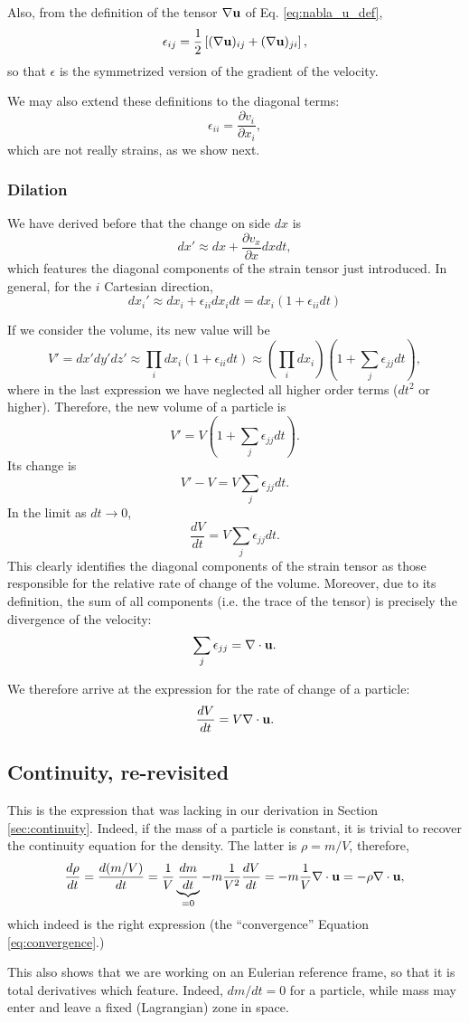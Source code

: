 Also, from the definition of the tensor $\nabla \mathbf{u}$ of
Eq. \ref{eq:nabla_u_def},
\begin{equation}
  \label{eq:epsilon_as_grad_u}
  \epsilon_{ij} = \frac12
  \left[
    (\nabla \mathbf{u})_{ij} +
    (\nabla \mathbf{u})_{ji}
  \right] ,
\end{equation}
so that $\epsilon$ is the symmetrized version of the gradient of the
velocity.

We may also extend these definitions to the diagonal terms:
\[
  \epsilon_{ii} =   \frac{\partial v_i}{\partial x_i} ,
\]
which are not really strains, as we show next.

\subsubsection{Dilation}

We have derived before that the change on side $dx$ is
\[
dx' \approx  dx + \frac{\partial v_x}{\partial x} dx dt ,
\]
which features the diagonal components of the strain tensor just
introduced. In general, for the $i$ Cartesian direction,
\[
dx_i' \approx dx_i + \epsilon_{ii} dx_i dt = dx_i
\left(
1+\epsilon_{ii} dt
\right)
\]

If we consider the volume, its new value will be
\[
V'= dx' dy' dz'  \approx  \prod_i  dx_i \left( 1+\epsilon_{ii} dt \right)
\approx \left(\prod_i  dx_i \right) \left( 1 + \sum_j  \epsilon_{jj} dt \right) ,
\]
where in the last expression we have neglected all higher order terms
($dt^2$ or higher). Therefore, the new volume of a particle is
\[
V' = V \left( 1 + \sum_j  \epsilon_{jj} dt \right) .
\]
Its change is
\[
V'-V =  V \sum_j  \epsilon_{jj} dt .
\]
In the limit as $dt\to 0$,
\[
\frac{d V}{dt} = V \sum_j  \epsilon_{jj} dt .
\]
This clearly identifies the diagonal components of the strain tensor
as those responsible for the relative rate of change of the volume.
Moreover, due to its definition, the sum of all components (i.e. the
trace of the tensor) is precisely the divergence of the velocity:
\[
\sum_j  \epsilon_{jj} = \nabla\cdot \mathbf{u} .
\]

We therefore arrive at the expression for the rate of change of a particle:
\[
\frac{d V}{dt} = V  \nabla\cdot \mathbf{u} .
\]

\subsection{Continuity, re-revisited}
\label{sec:continuity3}

This is the expression that was lacking in our derivation in
Section \ref{sec:continuity}. Indeed, if the mass of a particle is
constant, it is trivial to recover the continuity equation for the
density. The latter is $\rho=m/V$, therefore,
\[
\frac{d \rho }{dt} =
\frac{d (m/V) }{dt} = \frac1V \underbrace{\frac{ dm }{dt}}_{=0} -
m\frac1{V^2}  \frac{ dV }{dt } =
- m\frac1{V}  \nabla\cdot \mathbf{u}  = -\rho \nabla\cdot \mathbf{u} ,
\]
which indeed is the right expression (the ``convergence'' Equation
\ref{eq:convergence}.)

This also shows that we are working on an Eulerian reference frame, so
that it is total derivatives which feature. Indeed, $dm/dt=0$ for a
particle, while mass may enter and leave a fixed (Lagrangian) zone in
space.

